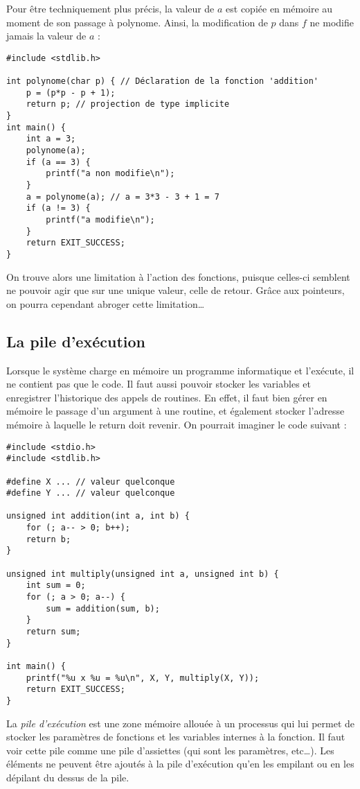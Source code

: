 \documentclass[../../../main.tex]{subfiles}
\begin{document}
Pour être techniquement plus précis, la valeur de $a$ est copiée en mémoire au moment de son passage à \textsf{polynome}. Ainsi, la modification de $p$ dans $f$ ne modifie jamais la valeur de $a$ :
\begin{verbatim}
#include <stdlib.h>

int polynome(char p) { // Déclaration de la fonction 'addition'
	p = (p*p - p + 1);
	return p; // projection de type implicite
}
int main() {
	int a = 3;
	polynome(a);
	if (a == 3) {
		printf("a non modifie\n");
	}
	a = polynome(a); // a = 3*3 - 3 + 1 = 7
	if (a != 3) {
		printf("a modifie\n");
	}
	return EXIT_SUCCESS;
}
\end{verbatim}
On trouve alors une limitation à l'action des fonctions, puisque celles-ci semblent ne pouvoir agir que sur une unique valeur, celle de retour. Grâce aux pointeurs, on pourra cependant abroger cette limitation\dots
\subsection{La pile d'exécution}
\label{sub:la_pile_d_ex_cution}
Lorsque le système charge en mémoire un programme informatique et l'exécute, il ne contient pas que le code. Il faut aussi pouvoir stocker les variables et enregistrer l'historique des appels de routines. En effet, il faut bien	gérer en mémoire le passage d'un argument à une routine, et également stocker l'adresse mémoire à laquelle le \textsf{return} doit revenir. On pourrait imaginer le code suivant :
\begin{verbatim}
#include <stdio.h>
#include <stdlib.h>

#define X ... // valeur quelconque
#define Y ... // valeur quelconque

unsigned int addition(int a, int b) {
	for (; a-- > 0; b++);
	return b;
}

unsigned int multiply(unsigned int a, unsigned int b) {
	int sum = 0;
	for (; a > 0; a--) {
		sum = addition(sum, b);
	}
	return sum;
}

int main() {
	printf("%u x %u = %u\n", X, Y, multiply(X, Y));
	return EXIT_SUCCESS;
}
\end{verbatim}
La \textit{pile d'exécution} est une zone mémoire allouée à un processus qui lui permet de stocker les paramètres de fonctions et les variables internes à la fonction. Il faut voir cette pile comme une pile d'assiettes (qui sont les paramètres, etc\dots). Les éléments ne peuvent être ajoutés à la pile d'exécution qu'en les empilant ou en les dépilant du dessus de la pile.
 
\end{document}
